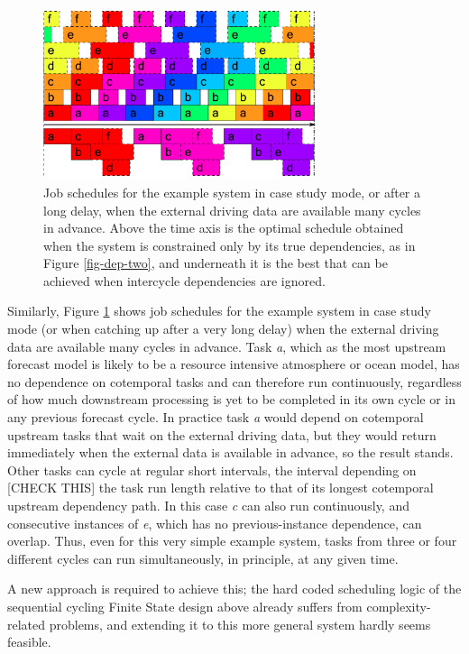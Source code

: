 \documentclass[11pt,a4paper]{article}
\begin{document}
\begin{figure} 
    \begin{center} 
        \includegraphics[width=8cm]{timeline-two}
    \end{center} 
    \caption{\small Job schedules for the example system in case study
    mode, or after a long delay, when the external driving data are
    available many cycles in advance. Above the time axis is the optimal
    schedule obtained when the system is constrained only by its true
    dependencies, as in Figure \ref{fig-dep-two}, and underneath it is
    the best that can be achieved when intercycle dependencies are
    ignored.} 
    \label{fig-time-two}
\end{figure} 

Similarly, Figure \ref{fig-time-two} shows job schedules for the example
system in case study mode (or when catching up after a very long delay)
when the external driving data are available many cycles in advance.
Task {\em a}, which as the most upstream forecast model is likely to be
a resource intensive atmosphere or ocean model, has no dependence on
cotemporal tasks and can therefore run continuously, regardless of how
much downstream processing is yet to be completed in its own cycle or in
any previous forecast cycle. In practice task {\em a} would depend on
cotemporal upstream tasks that wait on the external driving data, but
they would return immediately when the external data is available in
advance, so the result stands. Other tasks can cycle at regular short
intervals, the interval depending on [CHECK THIS] the task run length
relative to that of its longest cotemporal upstream dependency path. In
this case {\em c} can also run continuously, and consecutive instances
of {\em e}, which has no previous-instance dependence, can overlap.
Thus, even for this very simple example system, tasks from three or four
different cycles can run simultaneously, in principle, at any given
time. 

A new approach is required to achieve this; the hard coded scheduling
logic of the sequential cycling Finite State design above already
suffers from complexity-related problems, and extending it to this more
general system hardly seems feasible. 
\end{document}
